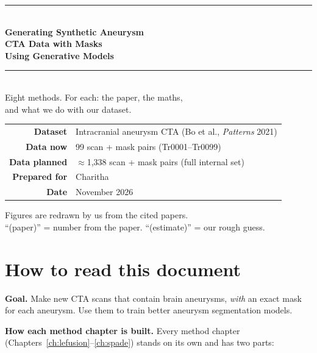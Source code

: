 \documentclass[11pt,a4paper,oneside]{report}
\begin{document}

\begin{titlepage}
\centering
\vspace*{3cm}
{\color{acc}\rule{\linewidth}{1pt}}\\[10pt]
{\huge\bfseries\color{ink} Generating Synthetic Aneurysm\\[4pt] CTA Data with Masks\\[4pt] Using Generative Models}\\[10pt]
{\color{acc}\rule{\linewidth}{1pt}}\\[18pt]
{\Large Eight methods. For each: the paper, the maths,\\ and what we do with our dataset.}\\[40pt]
\begin{tabular}{rl}
\textbf{Dataset} & Intracranial aneurysm CTA (Bo et al., \emph{Patterns} 2021)\\
\textbf{Data now} & 99 scan + mask pairs (Tr0001--Tr0099)\\
\textbf{Data planned} & $\approx$1{,}338 scan + mask pairs (full internal set)\\
\textbf{Prepared for} & Charitha\\
\textbf{Date} & November 2026
\end{tabular}
\vfill
{\small Figures are redrawn by us from the cited papers.\\
``(paper)'' = number from the paper. ``(estimate)'' = our rough guess.}
\end{titlepage}

\tableofcontents
\clearpage

\chapter*{How to read this document}

\textbf{Goal.} Make new CTA scans that contain brain aneurysms, \emph{with} an exact mask for each aneurysm. Use them to train better aneurysm segmentation models.

\textbf{How each method chapter is built.} Every method chapter (Chapters~\ref{ch:lefusion}--\ref{ch:spade}) stands on its own and has two parts:
\end{document}
